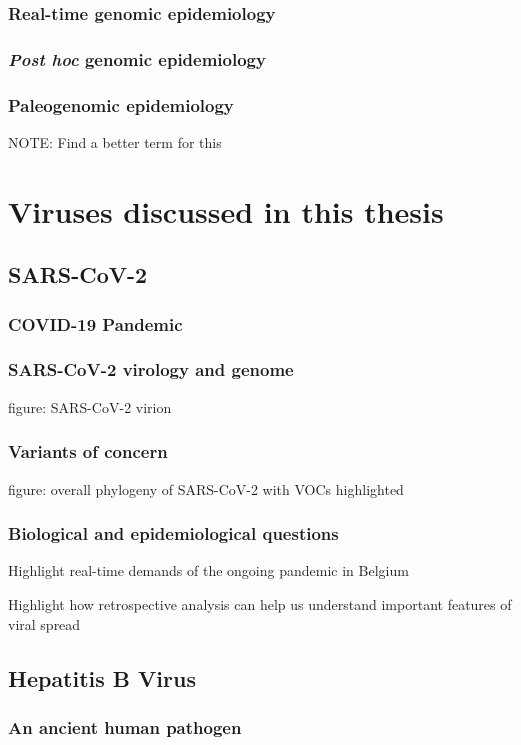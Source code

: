 \subsubsection{Real-time genomic epidemiology}
\subsubsection{\textit{Post hoc} genomic epidemiology}
\subsubsection{Paleogenomic epidemiology}
NOTE: Find a better term for this

  \section{Viruses discussed in this thesis}

    \subsection{SARS-CoV-2}
      \subsubsection{COVID-19 Pandemic}
      \subsubsection{SARS-CoV-2 virology and genome}
      figure: SARS-CoV-2 virion
      \subsubsection{Variants of concern}
      figure: overall phylogeny of SARS-CoV-2 with VOCs highlighted
      \subsubsection{Biological and epidemiological questions}
      Highlight real-time demands of the ongoing pandemic in Belgium

      Highlight how retrospective analysis can help us understand important features of viral spread

    \subsection{Hepatitis B Virus}
      \subsubsection{An ancient human pathogen}
